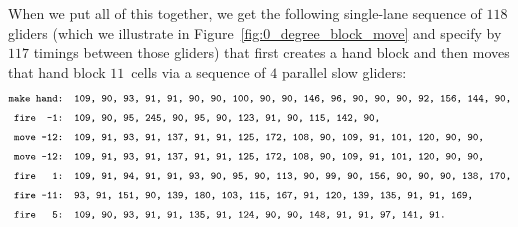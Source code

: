 When we put all of this together, we get the following single-lane sequence of $118$ gliders (which we illustrate in Figure~\ref{fig:0_degree_block_move} and specify by $117$ timings between those gliders) that first creates a hand block and then moves that hand block $11$~cells via a sequence of $4$ parallel slow gliders:
\begin{align*}
& \text{\texttt{\footnotesize make hand: {\footnotesize 109, 90, 93, 91, 91, 90, 90, 100, 90, 90, 146, 96, 90, 90, 90, 92, 156, 144, 90,}}} \\
& \text{\texttt{\footnotesize ~fire~~-1: {\footnotesize 109, 90, 95, 245, 90, 95, 90, 123, 91, 90, 115, 142, 90,}}} \\
& \text{\texttt{\footnotesize ~move~-12: {\footnotesize 109, 91, 93, 91, 137, 91, 91, 125, 172, 108, 90, 109, 91, 101, 120, 90, 90,}}} \\
& \text{\texttt{\footnotesize ~move~-12: {\footnotesize 109, 91, 93, 91, 137, 91, 91, 125, 172, 108, 90, 109, 91, 101, 120, 90, 90,}}} \\
& \text{\texttt{\footnotesize ~fire~~~1: {\footnotesize 109, 91, 94, 91, 91, 93, 90, 95, 90, 113, 90, 99, 90, 156, 90, 90, 90, 138, 170,}}} \\
& \text{\texttt{\footnotesize ~fire~-11: {\footnotesize 93, 91, 151, 90, 139, 180, 103, 115, 167, 91, 120, 139, 135, 91, 91, 169,}}} \\
& \text{\texttt{\footnotesize ~fire~~~5: {\footnotesize 109, 90, 93, 91, 91, 135, 91, 124, 90, 90, 148, 91, 91, 97, 141, 91.}}}
\end{align*}

